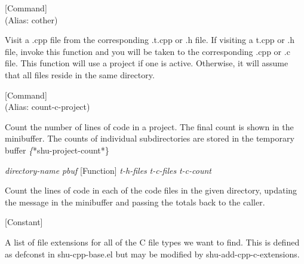 \vspace{1em}
\noindent
{}
\usebox{\funcname}
 \hfill [Command]\\%
 (Alias: cother)

\begin{doc-string}
Visit a .cpp file from the corresponding .t.cpp or .h file.  If visiting a
t.cpp or .h file, invoke this function and you will be taken to the
corresponding .cpp or .c file.  This function will use a project if one is
active.  Otherwise, it will assume that all files reside in the same directory.
\end{doc-string}

\vspace{1em}
\noindent
{}
\usebox{\funcname}
 \hfill [Command]\\%
 (Alias: count-c-project)

\begin{doc-string}
Count the number of lines of code in a project.  The final count is shown in
the minibuffer.  The counts of individual subdirectories are stored in the
temporary buffer \emph\{*shu-project-count*\}
\end{doc-string}

\vspace{1em}
\noindent
{}
\usebox{\funcname}\emph{directory-name} \emph{pbuf}
 \hfill [Function]
\hspace*{\wd\funcname}\emph{t-h-files} \emph{t-c-files}
\hspace*{\wd\funcname}\emph{t-c-count}

\begin{doc-string}
Count the lines of code in each of the code files in the given directory, updating
the message in the minibuffer and passing the totals back to the caller.
\end{doc-string}

\vspace{1em}
\noindent
{}
\usebox{\funcname}
 \hfill [Constant]

\begin{doc-string}
A list of file extensions for all of the C file types we want to find.  This is defined
as defconst in shu-cpp-base.el but may be modified by shu-add-cpp-c-extensions.
\end{doc-string}

